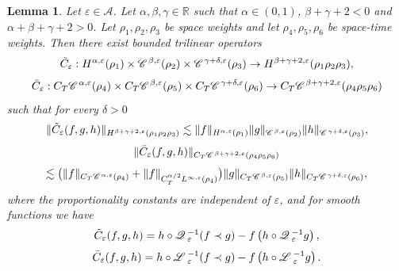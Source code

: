 \documentclass[a4paper,11pt]{article}
\newtheorem{lemma}[theorem]{Lemma}
\numberwithin{equation}{section}
\newcommand{\CC}{\mathscr{C} \hspace{.1em}}
\newcommand{\LL}{\mathscr{L} \hspace{.2em}}
\newcommand{\Q}{\mathscr{Q} \hspace{.2em}}
\begin{document}
\begin{lemma}
  \label{lem:comm1}Let $\varepsilon \in \mathcal{A}$. Let $\alpha, \beta,
  \gamma \in \mathbb{R}$ such that $\alpha\in (0,1)$, $\beta + \gamma + 2 < 0$ and $\alpha +
  \beta + \gamma + 2 > 0$. Let $\rho_1, \rho_2, \rho_3$ be space weights and
  let $\rho_4, \rho_5, \rho_6$ be space-time weights. Then there exist bounded
  trilinear operators
  \[ \tilde{C}_{\varepsilon} : H^{\alpha, \varepsilon} (\rho_1) \times
     \CC^{\beta, \varepsilon} (\rho_2) \times \CC^{\gamma + \delta,
     \varepsilon} (\rho_3) \rightarrow H^{\beta + \gamma + 2, \varepsilon}
     (\rho_1 \rho_2 \rho_3), \]
  \[ \bar{C}_{\varepsilon} : C_T \CC^{\alpha, \varepsilon} (\rho_4) \times C_T
     \CC^{\beta, \varepsilon} (\rho_5) \times C_T \CC^{\gamma + \delta,
     \varepsilon} (\rho_6) \rightarrow C_T \CC^{\beta + \gamma + 2,
     \varepsilon} (\rho_4 \rho_5 \rho_6) \]
  such that for every $\delta > 0$
  \[ \| \tilde{C}_{\varepsilon} (f, g, h) \|_{H^{\beta + \gamma + 2,
     \varepsilon} (\rho_1 \rho_2 \rho_3)} \lesssim \| f \|_{H^{\alpha,
     \varepsilon} (\rho_1)} \| g \|_{\CC^{\beta, \varepsilon} (\rho_2)} \| h
     \|_{\CC^{\gamma + \delta, \varepsilon} (\rho_3)}, \]
  \[ \| \bar{C}_{\varepsilon} (f, g, h) \|_{C_T \CC^{\beta + \gamma + 2,
     \varepsilon} (\rho_4 \rho_5 \rho_6)} \]
  \[ \lesssim \big( \| f \|_{C_T \CC^{\alpha, \varepsilon} (\rho_4)} + \| f
     \|_{C_T^{\alpha / 2} L^{\infty, \varepsilon} (\rho_4)} \big) \| g
     \|_{C_T \CC^{\beta, \varepsilon} (\rho_5)} \| h \|_{C_T \CC^{\gamma +
     \delta, \varepsilon} (\rho_6)}, \]
  where the proportionality constants are independent of $\varepsilon$, and
  for smooth functions we have
  \begin{equation}
    \tilde{C}_{\varepsilon} (f, g, h) = h \circ \Q_{\varepsilon}^{- 1} (f
    \prec g) - f \left( h \circ \Q_{\varepsilon}^{- 1} g \right), \label{eq:9}
  \end{equation}
  \[ \bar{C}_{\varepsilon} (f, g, h) = h \circ \LL_{\varepsilon}^{- 1} (f
     \prec g) - f \left( h \circ \LL_{\varepsilon}^{- 1} g \right) . \]
\end{lemma}
\end{document}
